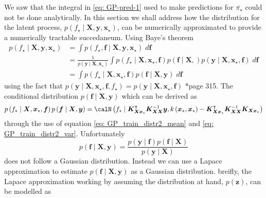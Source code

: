 We saw that the integral in \ref{eq: GP-pred-1} used to make predictions for $\overline{\pi_{\star}}$ could not be done analytically. In this section we shall address how the distribution for the latent process, $p \left( f_{\star} \mid \bm{X} , \bm{y} , \bm{x}_{\star} \right)$, can be numerically approximated to provide a numerically tractable succedaneum. Using Baye's theorem
\begin{align*}
    p \left( f_{\star} \mid \bm{X} , \bm{y} , \bm{x}_{\star} \right)
     & = \int p \left( f_{\star} , \bm{f} \mid \bm{X} , \bm{y} , \bm{x}_{\star} \right) \; d \bm{f}                                                                                                                                                         \\
     & = \frac{1}{p \left( \bm{y} \mid \bm{X} , \bm{x}_{\star} \right)} \int p \left( f_{\star} \mid \bm{X} , \bm{x}_{\star}, \bm{f} \right) p \left( \bm{f} \mid \bm{X} , \right) p \left( \bm{y} \mid \bm{X} , \bm{x}_{\star}, \bm{f} \right) \; d \bm{f} \\
     & = \int p \left( f_{\star} \mid \bm{X} , \bm{x}_{\star}, \bm{f} \right) p \left( \bm{f} \mid \bm{X} , \bm{y} \right) \; d \bm{f}
\end{align*}
using the fact that $p \left( \bm{y} \mid \bm{X} , \bm{x}_{\star}, \bm{f}, f_{\star} \right) = p \left( \bm{y} \mid \bm{X} , \bm{x}_{\star}, \bm{f} \right)$ \cite{BishopChristopherM2006Pram, RasmussenCarlEdward2006Gpfm}*{page 315}. The conditional distribution $p \left( \bm{f} \mid \bm{X} , \bm{y} \right)$ which can be derived as
\begin{equation*}
    p \left( f_{\star} \mid \bm{X} , \bm{x}_{\star}, \bm{f} \right) p \left( \bm{f} \mid \bm{X} , \bm{y} \right) = \calN \left( f_{\star} \mid \bm{K}_{\bm{X} \bm{x}_{\star}}^{\intercal} \bm{K}_{\bm{X} \bm{X}}^{-1} \bm{y}, k \left( \bm{x}_{\star}, \bm{x}_{\star} \right) - \bm{K}_{\bm{X} \bm{x}_{\star}}^{\intercal} \bm{K}_{\bm{X} \bm{X}}^{-1} \bm{K}_{\bm{X} \bm{x}_{\star}} \right)
\end{equation*}
through the use of equation \ref{eq: GP_train_distr2_mean} and \ref{eq: GP_train_distr2_var}. Unfortunately
\begin{equation*}
    p \left( \bm{f} \mid \bm{X} , \bm{y} \right) = \frac{p \left( \bm{y} \mid \bm{f} \right) p \left( \bm{f} \mid \bm{X} \right) }{p \left( \bm{y} \mid \bm{X} \right)}
\end{equation*}
does not follow a Gaussian distribution. Instead we can use a Lapace approximation to estimate $p \left( \bm{f} \mid \bm{X} , \bm{y} \right)$ as a Gaussian distribution. breifly, the Lapace approximation working by assuming the distribution at hand, $p \left( \bm{z} \right)$, can be modelled as
